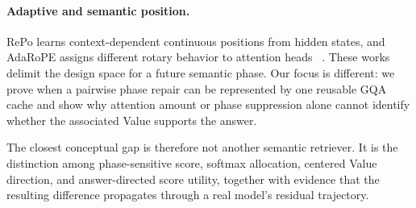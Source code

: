 \paragraph{Adaptive and semantic position.}
RePo learns context-dependent continuous positions from hidden states, and
AdaRoPE assigns different rotary behavior to attention heads
~\citep{li2026repo,wang2026adarope}.  These works delimit the design space for a
future semantic phase.  Our focus is different: we prove when a pairwise phase
repair can be represented by one reusable GQA cache and show why attention
amount or phase suppression alone cannot identify whether the associated Value
supports the answer.

The closest conceptual gap is therefore not another semantic retriever.  It is
the distinction among phase-sensitive score, softmax allocation, centered
Value direction, and answer-directed score utility, together with evidence
that the resulting difference propagates through a real model's residual
trajectory.
